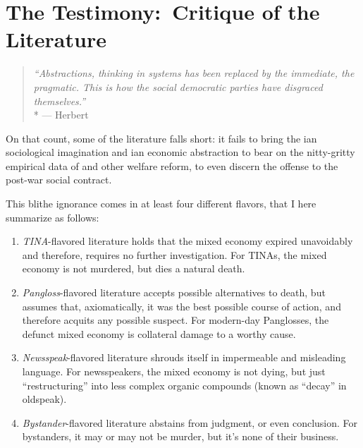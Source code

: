 
\section[Literature]{The Testimony:\ Critique of the Literature}
	\label{sec:Literature}

\begin{quote}
	\emph{``Abstractions, thinking in systems has been replaced by the immediate, the pragmatic.
	This is how the social democratic parties have disgraced themselves.''}
	\\*
	--- Herbert \citet[41]{Schui2009}
\end{quote}

On that count, some of the literature falls short:
it fails to bring the \citeauthor{Mills-1959-aa}ian sociological imagination and \citeauthor{Keynes1936}ian economic abstraction to bear on the nitty-gritty empirical data of  and other welfare reform, to even discern  the offense to the post-war social contract.

This blithe ignorance comes in at least four different flavors, that I here summarize as follows:
\begin{enumerate}
	\item \emph{TINA}-flavored literature holds that the mixed economy expired unavoidably and therefore, requires no further investigation.
	For TINAs, the mixed economy is not murdered, but dies a natural death.

	\item \emph{Pangloss}-flavored literature accepts possible alternatives to death, but assumes that, axiomatically, it was the best possible course of action, and therefore acquits any possible suspect.
	For modern-day Panglosses, the defunct mixed economy is collateral damage to a worthy cause.

	\item \emph{Newsspeak}-flavored literature shrouds itself in impermeable and misleading language.
	For newsspeakers, the mixed economy is not dying, but just ``restructuring'' into less complex organic compounds (known as ``decay'' in oldspeak).

	\item \emph{Bystander}-flavored literature abstains from judgment, or even conclusion.
	For bystanders, it may or may not be murder, but it's none of their business.
\end{enumerate}

